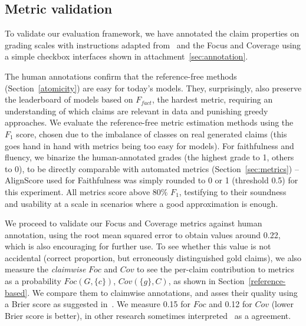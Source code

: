 \subsection{Metric validation}
To validate our evaluation framework, we have annotated the claim properties on grading scales with instructions adapted from~\cite{wright-etal-2022-generating} and the Focus and Coverage using a simple checkbox interfaces shown in attachment~\ref{sec:annotation}.

The human annotations confirm that the reference-free methods (Section~\ref{atomicity}) are easy for today's models.
They, surprisingly, also preserve the leaderboard of models based on $F_{fact}$, the hardest metric, requiring an understanding of which claims are relevant in \ds{} data and punishing greedy approaches.
We evaluate the reference-free metric estimation methods using the $F_1$ score, chosen due to the imbalance of classes on real generated claims (this goes hand in hand with metrics being too easy for models).
For faithfulness and fluency, we binarize the human-annotated grades (the highest grade to 1, others to 0), to be directly comparable with automated metrics (Section~\ref{sec:metrics}) -- AlignScore used for Faithfulness was simply rounded to 0 or 1 (threshold 0.5) for this experiment.
All metrics score above $80\%$ $F_1$, testifying to their soundness and usability at a scale in scenarios where a good approximation is enough.

We proceed to validate our Focus and Coverage metrics against human annotation, using the root mean squared error to obtain values around 0.22, which is also encouraging for further use.
To see whether this value is not accidental (correct proportion, but erroneously distinguished gold claims), we also measure the \textit{claimwise} $Foc$ and $Cov$ to see the per-claim contribution to metrics as a probability $Foc(G,\{c\})$, $Cov(\{g\},C)$,  as shown in Section~\ref{reference-based}.
We compare them to claimwise annotations, and asses their quality using a Brier score as suggested in~\citealt{rufibach2010use}. 
We measure 0.15 for $Foc$ and 0.12 for $Cov$ (lower Brier score is better), in other research sometimes interpreted~\cite{fernandes} as a  agreement.

